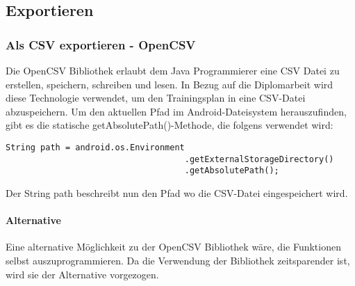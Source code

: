 \documentclass[FIPLY_base.tex]{subfiles}
\begin{document}
\subsection{Exportieren}
\subsubsection{Als CSV exportieren - OpenCSV}
Die OpenCSV Bibliothek erlaubt dem Java Programmierer eine CSV Datei zu erstellen, speichern, schreiben und lesen.
In Bezug auf die Diplomarbeit wird diese Technologie verwendet, um den Trainingsplan in eine CSV-Datei abzuspeichern.
Um den aktuellen Pfad im Android-Dateisystem herauszufinden, gibt es die statische getAbsolutePath()-Methode, die folgens verwendet wird:
\begin{lstlisting}[caption={Methode, um den aktuellen Pfad herauszufinden.},label=DescriptiveLabel]
	String path = android.os.Environment
									.getExternalStorageDirectory()
									.getAbsolutePath();
\end{lstlisting}
Der String \grqq{}path\grqq{} beschreibt nun den Pfad wo die CSV-Datei eingespeichert wird.

\paragraph{Alternative}
Eine alternative Möglichkeit zu der OpenCSV Bibliothek wäre, die Funktionen selbst auszuprogrammieren. Da die Verwendung der Bibliothek zeitsparender ist, wird sie der Alternative vorgezogen.
\end{document}
